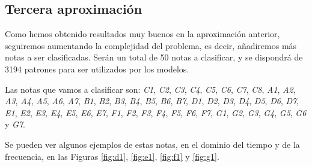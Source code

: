 \documentclass[12pt]{article}
\begin{document}
\newpage
\subsection{Tercera aproximación}
\label{Tercera aproximación}
Como hemos obtenido resultados muy buenos en la aproximación anterior, seguiremos aumentando la complejidad del problema,
es decir, añadiremos más notas a ser clasificadas. Serán un total de 50 notas a clasificar, y se dispondrá de 
3194 patrones para ser utilizados por los modelos.

\bigskip
Las notas que vamos a clasificar son: 
\textit{C1}, \textit{C2}, \textit{C3}, \textit{C4}, \textit{C5}, \textit{C6}, \textit{C7}, \textit{C8}, 
\textit{A1}, \textit{A2}, \textit{A3}, \textit{A4}, \textit{A5}, \textit{A6}, \textit{A7},
\textit{B1}, \textit{B2}, \textit{B3}, \textit{B4}, \textit{B5}, \textit{B6}, \textit{B7},
\textit{D1}, \textit{D2}, \textit{D3}, \textit{D4}, \textit{D5}, \textit{D6}, \textit{D7},
\textit{E1}, \textit{E2}, \textit{E3}, \textit{E4}, \textit{E5}, \textit{E6}, \textit{E7},
\textit{F1}, \textit{F2}, \textit{F3}, \textit{F4}, \textit{F5}, \textit{F6}, \textit{F7},
\textit{G1}, \textit{G2}, \textit{G3}, \textit{G4}, \textit{G5}, \textit{G6} y \textit{G7}.

Se pueden ver algunos ejemplos de estas notas, en el dominio del tiempo y de la frecuencia, en las Figuras
\ref{fig:d1}, \ref{fig:e1}, \ref{fig:f1} y \ref{fig:g1}.
\end{document}
